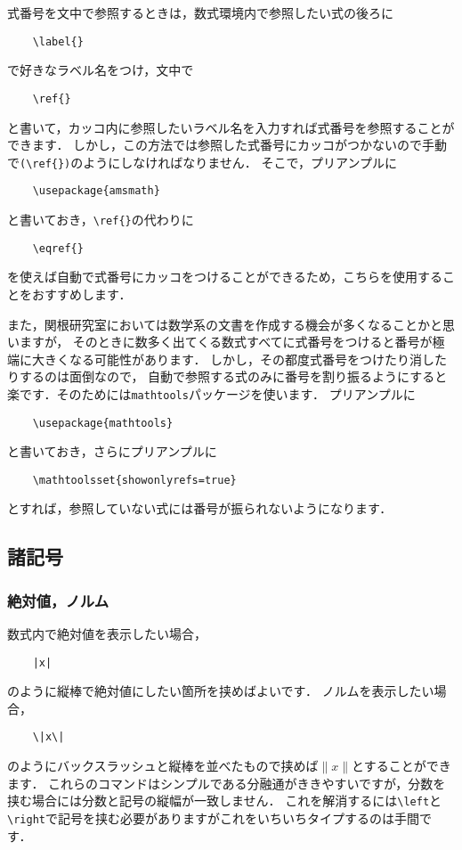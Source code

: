 \documentclass[a4paper,11pt,titlepage]{jsarticle}
\numberwithin{equation}{section}
\theoremstyle{definition}
\begin{document}
式番号を文中で参照するときは，数式環境内で参照したい式の後ろに
\begin{verbatim}
    \label{}
\end{verbatim}
で好きなラベル名をつけ，文中で
\begin{verbatim}
    \ref{}
\end{verbatim}
と書いて，カッコ内に参照したいラベル名を入力すれば式番号を参照することができます．
しかし，この方法では参照した式番号にカッコがつかないので手動で\verb|(\ref{})|のようにしなければなりません．
そこで，プリアンプルに
\begin{verbatim}
    \usepackage{amsmath}
\end{verbatim}
と書いておき，\verb|\ref{}|の代わりに
\begin{verbatim}
    \eqref{}
\end{verbatim}
を使えば自動で式番号にカッコをつけることができるため，こちらを使用することをおすすめします．

また，関根研究室においては数学系の文書を作成する機会が多くなることかと思いますが，
そのときに数多く出てくる数式すべてに式番号をつけると番号が極端に大きくなる可能性があります．
しかし，その都度式番号をつけたり消したりするのは面倒なので，
自動で参照する式のみに番号を割り振るようにすると楽です．そのためには\verb|mathtools|パッケージを使います．
プリアンプルに
\begin{verbatim}
    \usepackage{mathtools}
\end{verbatim}
と書いておき，さらにプリアンプルに
\begin{verbatim}
    \mathtoolsset{showonlyrefs=true}
\end{verbatim}
とすれば，参照していない式には番号が振られないようになります\cite{FomulaNumber}．

\subsection{諸記号}

\subsubsection{絶対値，ノルム}

数式内で絶対値を表示したい場合，
\begin{verbatim}
    |x|
\end{verbatim}
のように縦棒で絶対値にしたい箇所を挟めばよいです．
ノルムを表示したい場合，
\begin{verbatim}
    \|x\|
\end{verbatim}
のようにバックスラッシュと縦棒を並べたもので挟めば$\|x\|$とすることができます．
これらのコマンドはシンプルである分融通がききやすいですが，分数を挟む場合には分数と記号の縦幅が一致しません．
これを解消するには\verb|\left|と\verb|\right|で記号を挟む必要がありますがこれをいちいちタイプするのは手間です．
\end{document}
